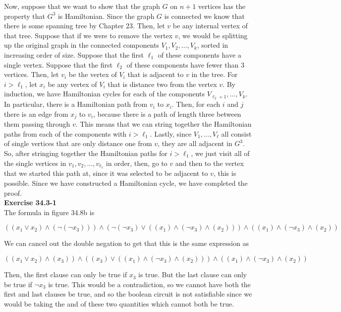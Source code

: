 \documentclass{article}
\begin{document}
Now, suppose that we want to show that the graph $G$ on $n+1$ vertices has the property that $G^3$ is Hamiltonian. Since the graph $G$ is connected we know that there is some spanning tree by Chapter 23. Then, let $v$ be any internal vertex of that tree. Suppose that  if we were to remove the vertex $v$, we would be splitting up the original graph in the connected components $V_1, V_2,\ldots, V_k$, sorted in increasing order of size. Suppose that the first $\ell_1$ of these components have a single vertex. Suppose that the first $\ell_2$ of these components have fewer than $3$ vertices. Then, let $v_i$ be the vertex of $V_i$ that is adjacent to $v$ in the tree. For $i>\ell_1$, let $x_i$ be any vertex of $V_i$ that is distance two from the vertex $v$. By induction, we have Hamiltonian cycles for each of the components $V_{\ell_2+1}, \ldots, V_k$. In particular, there is a Hamiltonian path from $v_i$ to $x_i$. Then, for each $i$ and $j$ there is an edge from $x_j$ to $v_i$, because there is a path of length three between them passing through $v$. This means that we can string together the Hamiltonian paths from each of the components with $i>\ell_1$. Lastly, since $V_1, \ldots, V_{\ell}$ all consist of single vertices that are only distance one from $v$, they are all adjacent in $G^3$. So, after stringing together the Hamiltonian paths for $i>\ell_1$, we just visit all of the single vertices in $v_1,v_2,\ldots, v_{\ell_1}$ in order, then, go to $v$ and then to the vertex that we started this path at, since it was selected to be adjacent to $v$, this is possible. Since we have constructed a Hamiltonian cycle, we have completed the proof.\\


\noindent\textbf{Exercise 34.3-1}\\

The formula in figure 34.8b is 

\[((x_1\vee x_2)\wedge(\neg(\neg x_3)))\wedge(\neg(\neg x_3) \vee ((x_1)\wedge(\neg x_3)\wedge(x_2)))\wedge((x_1)\wedge(\neg x_3)\wedge(x_2))\]

We can cancel out the double negation to get that this is the same expression as

\[((x_1\vee x_2)\wedge(x_3))\wedge(( x_3) \vee ((x_1)\wedge(\neg x_3)\wedge(x_2)))\wedge((x_1)\wedge(\neg x_3)\wedge(x_2))\]

Then, the first clause can only be true if $x_3$ is true. But the last clause can only be true if $\neg x_3$ is true. This would be a contradiction, so we cannot have both the first and last clauses be true, and so the boolean circuit is not satisfiable since we would be taking the and of these two quantities which cannot both be true.\\
\end{document}

